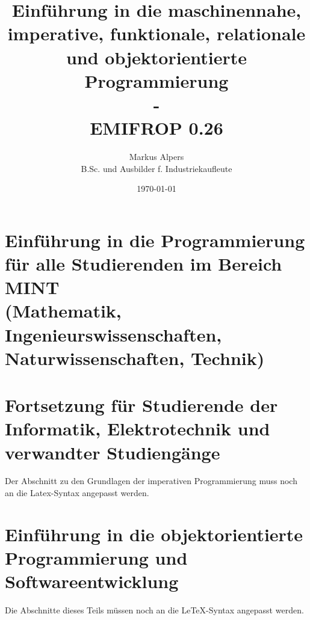 \documentclass[11pt, a4paper, oneside]{book}
\begin{document}

\title{Einführung in die maschinennahe, imperative, funktionale, relationale und objektorientierte Programmierung\\-\\EMIFROP 0.26}
\author{Markus Alpers\\B.Sc. und Ausbilder f. Industriekaufleute}
\date{\today}

\maketitle


\tableofcontents




\part{Einführung in die Programmierung für alle Studierenden im Bereich MINT\\ \small{(Mathematik, Ingenieurswissenschaften, Naturwissenschaften, Technik)}}










%

\part{Fortsetzung für Studierende der Informatik, Elektrotechnik und verwandter Studiengänge}



Der Abschnitt zu den Grundlagen der imperativen Programmierung muss noch an die Latex-Syntax angepasst werden.
%

\part{Einführung in die objektorientierte Programmierung und Softwareentwicklung}

Die Abschnitte dieses Teils müssen noch an die LeTeX-Syntax angepasst werden.
%

%

%

\renewcommand{\indexname}{Stichwortverzeichnis}		%
\printindex
\end{document}
